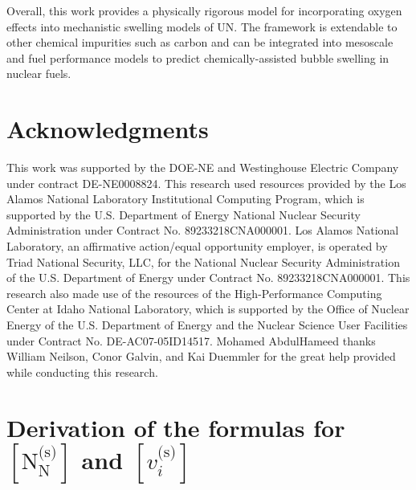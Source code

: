 \documentclass[preprint,12pt,sort&compress]{elsarticle}
\newcommand{\?}{\stackrel{?}{=}}
\begin{document}
Overall, this work provides a physically rigorous model for incorporating oxygen effects into mechanistic swelling models of UN. The framework is extendable to other chemical impurities such as carbon and can be integrated into mesoscale and fuel performance models to predict chemically-assisted bubble swelling in nuclear fuels.

\section{Acknowledgments}

This work was supported by the DOE-NE and Westinghouse Electric Company under contract DE-NE0008824. This research used resources provided by the Los Alamos National Laboratory Institutional Computing Program, which is supported by the U.S. Department of Energy National Nuclear Security Administration under Contract No. 89233218CNA000001. Los Alamos National Laboratory, an affirmative action/equal opportunity employer, is operated by Triad National Security, LLC, for the National Nuclear Security Administration of the U.S. Department of Energy under Contract No. 89233218CNA000001. This research also made use of the resources of the High-Performance Computing Center at Idaho National Laboratory, which is supported by the Office of Nuclear Energy of the U.S. Department of Energy and the Nuclear Science User Facilities under Contract No. DE-AC07-05ID14517. Mohamed AbdulHameed thanks William Neilson, Conor Galvin, and Kai Duemmler for the great help provided while conducting this research.

\appendix

\section{Derivation of the formulas for $[ \text{N}_\text{N}^\text{(s)} ]$ and $[ v_i^\text{(s)} ]$}
\label{App1}
\end{document}
